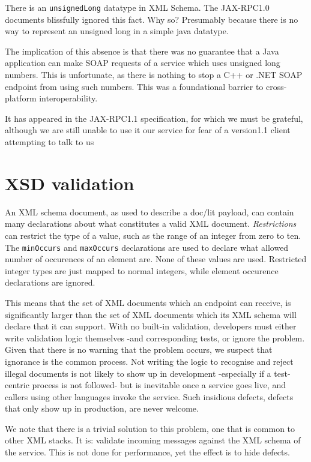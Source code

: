 \documentclass[draft]{paper}
\begin{document}
There is an \verb|unsignedLong| datatype in XML Schema. The JAX-RPC1.0 documents
blissfully ignored this fact. Why so? Presumably because there is no way to
represent an unsigned long in a simple java datatype. 

The implication of this absence is that there was no guarantee that a Java
application can make SOAP requests of a service which uses unsigned long
numbers. This is unfortunate, as there is nothing to stop a C++ or .NET SOAP
endpoint from using such numbers. This was a foundational barrier to
cross-platform interoperability. 

It has appeared in the JAX-RPC1.1 specification, for which we must be grateful,
although we are still unable to use it our service for fear of a version1.1
client attempting to talk to us


\section{XSD validation}

An XML schema document, as used to describe a doc/lit payload, can contain many
declarations about what constitutes a valid XML document. \emph{Restrictions}
can restrict the type of a value, such as the range of an integer from zero to
ten. The \verb|minOccurs| and \verb|maxOccurs| declarations are used to declare
what allowed number of occurences of an element are. None of these values are
used. Restricted integer types are just mapped to normal integers, while element
occurence declarations are ignored. 

This means that the set of XML documents which an endpoint can receive, is
significantly larger than the set of XML documents which its XML schema will
declare that it can support. With no built-in validation, developers must either
write validation logic themselves -and corresponding tests, or ignore the
problem. Given that there is no warning that the problem occurs, we suspect that
ignorance is the common process. Not writing the logic to recognise and reject
illegal documents is not likely to show up in development -especially if a
test-centric process is not followed- but is inevitable once a service goes live,
and callers using other languages invoke the service. Such insidious defects,
defects that only show up in production, are never welcome. 

We note that there is a trivial solution to this problem, one that is common to
other XML stacks. It is: validate incoming messages against the XML schema of
the service. This is not done for performance, yet the effect is to hide
defects.  
\end{document}
